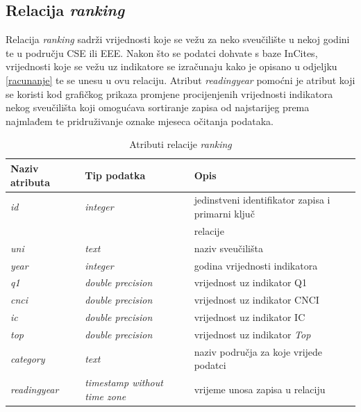 \documentclass[times, utf8, zavrsni]{fer}
\begin{document}
           \subsection{Relacija \emph{ranking}}
           Relacija \emph{ranking} sadrži vrijednosti koje se vežu za neko sveučilište u nekoj godini te u području CSE ili EEE. 
           Nakon što se podatci dohvate s baze InCites, vrijednosti koje se vežu uz indikatore se izračunaju kako je opisano u odjeljku \ref{racunanje} 
           te se unesu u ovu relaciju. Atribut \emph{readingyear} pomoćni je atribut koji se koristi kod grafičkog prikaza promjene procijenjenih vrijednosti indikatora
           nekog sveučilišta koji omogućava sortiranje zapisa od najstarijeg prema najmlađem te pridruživanje oznake mjeseca očitanja podataka.
           \begin{table}[htb]
               \caption{Atributi relacije \emph{ranking}}
                   \label{tbl:ranking}
           
                   \begin{tabular}{lll} \hline
                   Naziv atributa & Tip podatka & Opis\\ \hline
                   \emph{id} &  \emph{integer} & jedinstveni identifikator zapisa i primarni ključ \\ &&relacije\\
                   \emph{uni} &  \emph{text} & naziv sveučilišta\\
                   \emph{year} &  \emph{integer} & godina vrijednosti indikatora\\
                   \emph{q1} &  \emph{double precision} & vrijednost uz indikator Q1\\
                   \emph{cnci} &  \emph{double precision} & vrijednost uz indikator CNCI\\
                   \emph{ic} &  \emph{double precision} & vrijednost uz indikator IC\\
                   \emph{top} &  \emph{double precision} & vrijednost uz indikator \emph{Top}\\
                   \emph{category} &  \emph{text} & naziv područja za koje vrijede podatci\\
                   \emph{readingyear} &  \emph{timestamp without time zone} & vrijeme unosa zapisa u relaciju\\
                   \end{tabular}
                   \end{table}    
                   \FloatBarrier 
\end{document}
